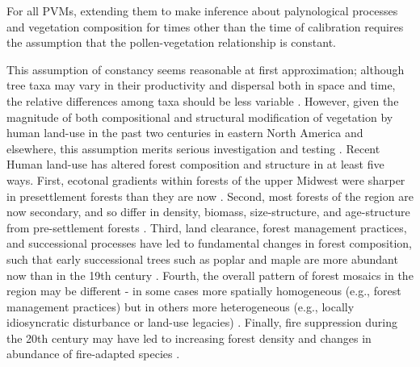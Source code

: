 \documentclass[12pt]{article}
\begin{document}




For all PVMs, extending them to make
inference about palynological processes and vegetation composition for
times other than the time of calibration requires the assumption that
the pollen-vegetation relationship is constant.

This assumption of constancy seems reasonable at first approximation;
although tree taxa may vary in their productivity and dispersal both
in space and time, the relative differences among taxa should be less
variable \citep{parsons1981statistical}.  However, given the magnitude
of both compositional and structural modification of vegetation by
human land-use in the past two centuries in eastern North America and
elsewhere, this assumption merits serious investigation and testing
\citep{kujawa2015}. Recent Human land-use has altered forest
composition and structure in at least five ways.  First, ecotonal
gradients within forests of the upper Midwest were sharper in
presettlement forests than they are now
\citep{goring_witness}. Second, most forests of the region are now
secondary, and so differ in density, biomass, size-structure, and
age-structure from pre-settlement forests
\citep{rhemtulla2009legacies}.  Third, land clearance, forest
management practices, and successional processes have led to
fundamental changes in forest composition, such that early
successional trees such as poplar and maple are more abundant now than
in the 19th century \citep{thompson2013four}.  Fourth, the overall
pattern of forest mosaics in the region may be different - in some
cases more spatially homogeneous (e.g., forest management practices)
but in others more heterogeneous (e.g., locally idiosyncratic
disturbance or land-use legacies) \citep{thompson2013four,
  wang2007spatial}. Finally, fire suppression during the 20th century
may have led to increasing forest density and changes in abundance of
fire-adapted species \citep{nowacki2008demise}.
\end{document}
